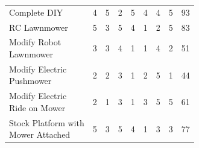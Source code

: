 \documentclass{article}
\begin{document}
\begin{table}[H]
\begin{adjustwidth}{-1.5in}{-1.5in}
\begin{tabular}{lcccccccc}
		\\[-2ex]
		\multicolumn{1}{l}{\cellcolor{highlight}Complete DIY}& \multicolumn{1}{c}{\cellcolor{highlight}4} & \multicolumn{1}{c}{\cellcolor{highlight}5} & \multicolumn{1}{c}{\cellcolor{highlight}2} & \multicolumn{1}{c}{\cellcolor{highlight}5} & \multicolumn{1}{c}{\cellcolor{highlight}4} & \multicolumn{1}{c}{\cellcolor{highlight}4} & \multicolumn{1}{c}{\cellcolor{highlight}5} & \multicolumn{1}{c}{\cellcolor{highlight}93}    \\ \hdashline
		RC Lawnmower                                           & 5                   & 3              & 5                    & 4                              & 1    & 2        & 5        & 83    \\ \hdashline
		\makecell[l]{Modify Robot \\ Lawnmower}                & 3                   & 3              & 4                    & 1                              & 1    & 4        & 2        & 51    \\ \hdashline
		\makecell[l]{Modify Electric \\ Pushmower}             & 2                   & 2              & 3                    & 1                              & 2    & 5        & 1        & 44    \\ \hdashline
		\makecell[l]{Modify Electric \\ Ride on Mower}         & 2                   & 1              & 3                    & 1                              & 3    & 5        & 5        & 61    \\ \hdashline
		\makecell[l]{Stock Platform with \\ Mower Attached}    & 5                   & 3              & 5                    & 4                              & 1    & 3        & 3        & 77    \\ 
		\end{tabular}
		
		\end{adjustwidth}
		\end{table}
		
\end{document}

